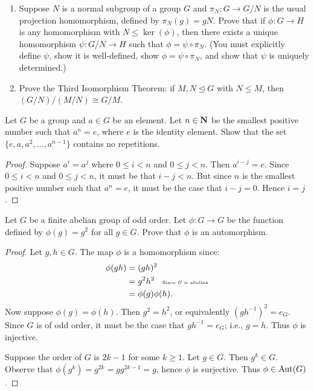 \documentclass[11pt,twoside,openany]{memoir}
\begin{document}
    \begin{exercise}
        \phantom{a}
        \begin{enumerate}[label=(\alph*)]
            \item Suppose $N$ is a normal subgroup of a group $G$ and $\pi_N:G\to G/N$ is the usual projection homomorphism, defined by $\pi_N(g)=gN$. Prove that if $\phi:G\to H$ is any homomorphism with $N\leq \ker(\phi)$, then there exists a unique homomorphism $\psi:G/N\to H$ such that $\phi = \psi\circ \pi_N$. (You must explicitly define $\psi$, show it is well-defined, show $\phi=\psi\circ\pi_N$, and show that $\psi$ is uniquely determined.)
            \item Prove the Third Isomorphism Theorem: if $M, N\unlhd G$ with $N\leq M$, then $(G/N)/(M/N)\cong G/M$.
        \end{enumerate}
    \end{exercise}

    \begin{exercise}
        Let $G$ be a group and $a \in G$ be an element. Let $n \in \bfN$ be the smallest positive number such that $a^n = e$, where $e$ is the identity element. Show that the set $\{e,a,a^2,...,a^{n-1}\}$ contains no repetitions.
    \end{exercise}
        {\color{blue} \begin{proof}
            Suppose $a^i = a^j$ where $0 \leq i < n$ and $0 \leq j < n$. Then $a^{i-j} = e$. Since $0 \leq i < n$ and $0 \leq j < n$, it must be that $i-j < n$. But since $n$ is the smallest positive number such that $a^n = e$, it must be the case that $i-j = 0$. Hence $i = j$.
        \end{proof}}

    \begin{exercise}
        Let $G$ be a finite abelian group of odd order. Let $\phi:G\to G$ be the function defined by $\phi(g)=g^2$ for all $g\in G$. Prove that $\phi$ is an automorphism.
    \end{exercise}
        {\color{blue} \begin{proof}
            Let $g,h \in G$. The map $\phi$ is a homomorphism since:
                \begin{equation*}
                \begin{split}
                    \phi(gh)
                    & = (gh)^2 \\
                    & = g^2 h^2 \h9\text{\tiny Since $G$ is abelian} \\
                    & = \phi(g)\phi(h).
                \end{split}
                \end{equation*}
            Now suppose $\phi(g) = \phi(h)$. Then $g^2 = h^2$, or equivalently $(gh^{-1})^2 = e_G$. Since $G$ is of odd order, it must be the case that $gh^{-1} = e_G$; i.e., $g = h$. Thus $\phi$ is injective.

            Suppose the order of $G$ is $2k-1$ for some $k \geq 1$. Let $g \in G$. Then $g^k \in G$. Observe that $\phi(g^k) = g^{2k} = g g^{2k-1} = g$, hence $\phi$ is surjective. Thus $\phi \in \Aut(G)$.
        \end{proof}}
\end{document}

